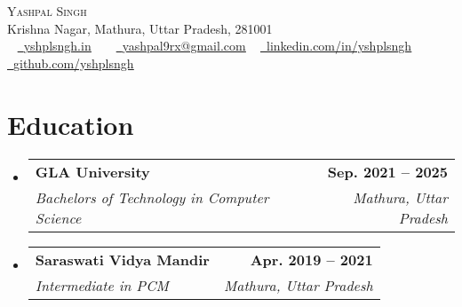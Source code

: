 \documentclass[letterpaper,11pt]{article}
\makeatletter
\newcommand{\resumeSubheading}[4]{
  \vspace{-2pt}\item
    \begin{tabular*}{1.0\textwidth}[t]{l@{\extracolsep{\fill}}r}
      \textbf{#1} & \textbf{\small #2} \\
      \textit{\small#3} & \textit{\small #4} \\
    \end{tabular*}\vspace{-7pt}
}
\newcommand{\resumeSubHeadingListStart}{\begin{itemize}[leftmargin=0.0in, label={}]}
\newcommand{\resumeSubHeadingListEnd}{\end{itemize}}
\makeatother
\begin{document}

\begin{center}
    {\Huge \scshape Yashpal Singh} \\ \vspace{1pt}
    \small Krishna Nagar, Mathura, Uttar Pradesh, 281001\\ \vspace{5pt}
    \small ~ \href{https://yshplsngh.in}{\raisebox{-0.2\height}\faLink\  \underline{yshplsngh.in}} ~
    \small ~ \href{mailto:yashpal9rx@gmail.com}{\raisebox{-0.2\height}\faEnvelope\  \underline{yashpal9rx@gmail.com}} ~ 
    \href{https://linkedin.com/in/yshplsngh/}{\raisebox{-0.2\height}\faLinkedin\ \underline{linkedin.com/in/yshplsngh}}  ~
    \href{https://github.com/yshplsngh}{\raisebox{-0.2\height}\faGithub\ \underline{github.com/yshplsngh}}
    \vspace{-1pt}
\end{center}



\section{Education}
 \vspace{5pt}
  \resumeSubHeadingListStart
    \resumeSubheading
      {GLA University}{Sep. 2021 -- 2025}
      {Bachelors of Technology in Computer Science}{Mathura, Uttar Pradesh}
        \resumeSubheading
      {Saraswati Vidya Mandir}{Apr. 2019 -- 2021}
      {Intermediate in PCM}{Mathura, Uttar Pradesh}
      
  \resumeSubHeadingListEnd

  

\end{document}
